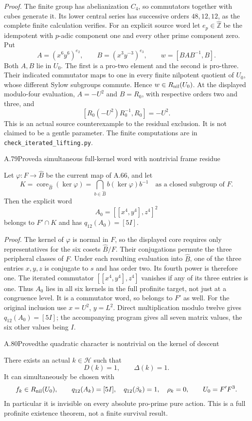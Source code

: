 \emph{Proof.}
The finite group has abelianization $C_4$, so commutators together
with cubes generate it. Its lower central series has successive
orders $48,12,12$, as the complete finite calculation verifies.
For an explicit source word let $e_p\in\widehat{\mathbb Z}$ be
the idempotent with $p$-adic component one and every other prime
component zero. Put
\[
 A=(x^6y^6)^{e_2},\qquad B=(x^3y^{-3})^{e_3},\qquad
 w=[BAB^{-1},B].
\]
Both $A,B$ lie in $U_0$. The first is a pro-two element and the
second is pro-three. Their indicated commutator maps to one in
every finite nilpotent quotient of $U_0$, whose different Sylow
subgroups commute. Hence $w\in R_{\rm nil}(U_0)$.
At the displayed modulo-four evaluation, $A=-U^2$ and $B=R_0$,
with respective orders two and three, and
\[
 [R_0(-U^2)R_0^{-1},R_0]=-U^2.
\]
This is an actual source counterexample to the residual exclusion.
It is not claimed to be a gentle parameter. The finite computations
are in \texttt{check\_iterated\_lifting.py}.

\begin{statement}{A.79}{Proved}{a simultaneous full-kernel word with nontrivial frame residue}
\end{statement}
Let $\varphi:F\to\widehat B$ be the current map of A.66, and let
\[
 K=\operatorname{core}_{\widehat B}(\ker\varphi)
   =\bigcap_{b\in\widehat B} b(\ker\varphi)b^{-1}
       \quad\text{as a closed subgroup of }F.
\]
Then the explicit word
\[
                   A_0=[[x^4,y^4],z^4]^2
\]
belongs to $F'\cap K$ and has $q_{12}(A_0)=[5I]$.

\emph{Proof.}
The kernel of $\varphi$ is normal in $F$, so the displayed core
requires only representatives for the six cosets $\widehat B/F$.
Their conjugations permute the three peripheral classes of $F$.
Under each resulting evaluation into $\widehat B$, one of the
three entries $x,y,z$ is conjugate to $s$ and has order two.
Its fourth power is therefore one. The iterated commutator
$[[x^4,y^4],z^4]$ vanishes if any of its three entries is one.
Thus $A_0$ lies in all six kernels in the full profinite target,
not just at a congruence level. It is a commutator word, so belongs
to $F'$ as well. For the original inclusion use
$x=U^2$, $y=L^2$. Direct multiplication modulo twelve gives
$q_{12}(A_0)=[5I]$; the accompanying program gives all seven
matrix values, the six other values being $I$.

\begin{statement}{A.80}{Proved}{the quadratic character is nontrivial on the kernel of descent}
\end{statement}
There exists an actual $k\in\mathcal H$ such that
\[
 \boxed{\ D(k)=1,\qquad\Delta(k)=1.\ }
\]
It can simultaneously be chosen with
\[
 f_k\in R_{\rm nil}(U_0),\qquad
 q_{12}(A_k)=[5I],\quad q_{12}(\beta_k)=1,\quad \rho_k=0,
 \qquad U_0=F'F^3.
\]
In particular it is invisible on every absolute pro-prime pure action.
This is a full profinite existence theorem, not a finite survival result.

